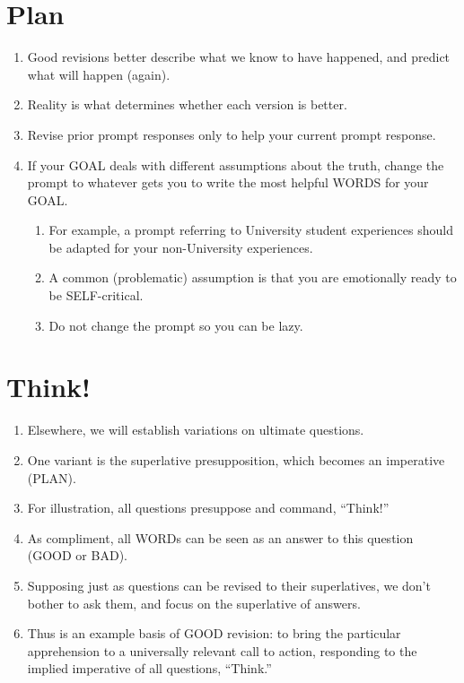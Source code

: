 \documentclass[
]{book}
\providecommand{\tightlist}{%
  \setlength{\itemsep}{0pt}\setlength{\parskip}{0pt}}
\begin{document}
\hypertarget{plan-2}{%
\section{Plan}\label{plan-2}}

\begin{enumerate}
\def\labelenumi{\arabic{enumi}.}
\setcounter{enumi}{4}
\tightlist
\item
  Good revisions better describe what we know to have happened, and predict what will happen (again).
\item
  Reality is what determines whether each version is better.
\item
  Revise prior prompt responses only to help your current prompt response.
\item
  If your GOAL deals with different assumptions about the truth, change the prompt to whatever gets you to write the most helpful WORDS for your GOAL.

  \begin{enumerate}
  \def\labelenumii{\arabic{enumii}.}
  \tightlist
  \item
    For example, a prompt referring to University student experiences should be adapted for your non-University experiences.
  \item
    A common (problematic) assumption is that you are emotionally ready to be SELF-critical.
  \item
    Do not change the prompt so you can be lazy.
  \end{enumerate}
\end{enumerate}

\hypertarget{think-1}{%
\section{Think!}\label{think-1}}

\begin{enumerate}
\def\labelenumi{\arabic{enumi}.}
\setcounter{enumi}{8}
\tightlist
\item
  Elsewhere, we will establish variations on ultimate questions.
\item
  One variant is the superlative presupposition, which becomes an imperative (PLAN).
\item
  For illustration, all questions presuppose and command, ``Think!''
\item
  As compliment, all WORDs can be seen as an answer to this question (GOOD or BAD).
\item
  Supposing just as questions can be revised to their superlatives, we don't bother to ask them, and focus on the superlative of answers.
\item
  Thus is an example basis of GOOD revision: to bring the particular apprehension to a universally relevant call to action, responding to the implied imperative of all questions, ``Think.''
\end{enumerate}
\end{document}
